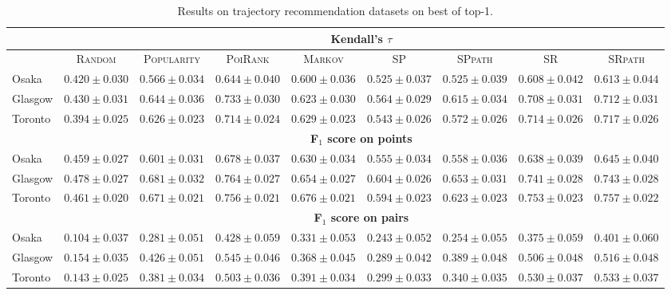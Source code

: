 \begin{table*}[!h]
\caption{Results on trajectory recommendation datasets on best of top-1.}
\centering
\scriptsize
\setlength{\tabcolsep}{3pt} %
\begin{tabular}{l|cc|ccc|ccc} \hline
& \multicolumn{8}{c}{\bf Kendall's $\tau$} \\ \hline
 & \textsc{Random} & \textsc{Popularity} & \textsc{PoiRank} & \textsc{Markov} & \textsc{SP} & \textsc{SPpath} & \textsc{SR} & \textsc{SRpath} \\ \hline
Osaka & $0.420\pm0.030$ & $0.566\pm0.034$ & $\mathbf{0.644\pm0.040}$ & $0.600\pm0.036$ & $0.525\pm0.037$ & $0.525\pm0.039$ & $0.608\pm0.042$ & $\mathit{0.613\pm0.044}$ \\
Glasgow & $0.430\pm0.031$ & $0.644\pm0.036$ & $\mathbf{0.733\pm0.030}$ & $0.623\pm0.030$ & $0.564\pm0.029$ & $0.615\pm0.034$ & $0.708\pm0.031$ & $\mathit{0.712\pm0.031}$ \\
Toronto & $0.394\pm0.025$ & $0.626\pm0.023$ & $\mathit{0.714\pm0.024}$ & $0.629\pm0.023$ & $0.543\pm0.026$ & $0.572\pm0.026$ & $0.714\pm0.026$ & $\mathbf{0.717\pm0.026}$ \\
\hline
& \multicolumn{8}{c}{\bf F$_1$ score on points} \\ \hline
Osaka & $0.459\pm0.027$ & $0.601\pm0.031$ & $\mathbf{0.678\pm0.037}$ & $0.630\pm0.034$ & $0.555\pm0.034$ & $0.558\pm0.036$ & $0.638\pm0.039$ & $\mathit{0.645\pm0.040}$ \\
Glasgow & $0.478\pm0.027$ & $0.681\pm0.032$ & $\mathbf{0.764\pm0.027}$ & $0.654\pm0.027$ & $0.604\pm0.026$ & $0.653\pm0.031$ & $0.741\pm0.028$ & $\mathit{0.743\pm0.028}$ \\
Toronto & $0.461\pm0.020$ & $0.671\pm0.021$ & $\mathit{0.756\pm0.021}$ & $0.676\pm0.021$ & $0.594\pm0.023$ & $0.623\pm0.023$ & $0.753\pm0.023$ & $\mathbf{0.757\pm0.022}$ \\
\hline
& \multicolumn{8}{c}{\bf F$_1$ score on pairs} \\ \hline
Osaka & $0.104\pm0.037$ & $0.281\pm0.051$ & $\mathbf{0.428\pm0.059}$ & $0.331\pm0.053$ & $0.243\pm0.052$ & $0.254\pm0.055$ & $0.375\pm0.059$ & $\mathit{0.401\pm0.060}$ \\
Glasgow & $0.154\pm0.035$ & $0.426\pm0.051$ & $\mathbf{0.545\pm0.046}$ & $0.368\pm0.045$ & $0.289\pm0.042$ & $0.389\pm0.048$ & $0.506\pm0.048$ & $\mathit{0.516\pm0.048}$ \\
Toronto & $0.143\pm0.025$ & $0.381\pm0.034$ & $0.503\pm0.036$ & $0.391\pm0.034$ & $0.299\pm0.033$ & $0.340\pm0.035$ & $\mathit{0.530\pm0.037}$ & $\mathbf{0.533\pm0.037}$ \\
\hline
\end{tabular}
\end{table*}


